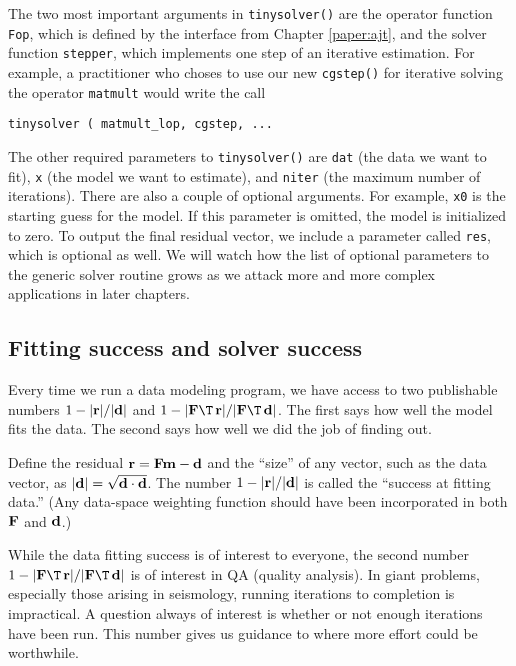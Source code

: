 \par
The two most important arguments in \texttt{tinysolver()}
are the operator function \texttt{Fop},
which is defined by the interface from Chapter \ref{paper:ajt},
and the solver function \texttt{stepper},
which implements one step of an iterative estimation.
For example, a practitioner who choses to use our new
\texttt{cgstep()} 
for iterative solving the operator
\texttt{matmult} 
would write the call
\par
\texttt{tinysolver ( matmult\_lop, cgstep, ...}
\par
The other required parameters to \texttt{tinysolver()} 
are \texttt{dat} (the data we want to fit),
\texttt{x} (the model we want to estimate),
and \texttt{niter} (the maximum number of iterations).
There are also a couple of optional arguments.
For example, \texttt{x0} is the starting guess for the model.
If this parameter is omitted, the model is initialized to zero.
To output the final residual vector,
we include a parameter called \texttt{res},
which is optional as well.
We will watch how the list of optional parameters
to the generic solver routine grows
as we attack more and more complex applications in later chapters.

\subsection{Fitting success and solver success}
Every time we run a data modeling program,
we have access to two publishable numbers
$1-|\bold r|/|\bold d|$ and
$1-|\bold F\T\,\bold r|/|\bold F\T\,\bold d|$.
The first says how well the model fits the data.
The second says how well we did the job of finding out.
\par
Define the residual $\bold r=\bold F\bold m-\bold d$ and
the ``size'' of any vector, such as the data vector,
as $|\bold d|=\sqrt{\bold d \cdot \bold d}$.
The number $1-|\bold r|/|\bold d|$ is called the
``success at fitting data.''
(Any data-space weighting function
should have been incorporated in both $\bold F$ and $\bold d$.)
\par
While the data fitting success is of interest to everyone,
the second number
$1-|\bold F\T\,\bold r|/|\bold F\T\,\bold d|$
is of interest in QA (quality analysis).
In giant problems,
especially those arising in seismology,
running iterations to completion is impractical.
A question always of interest is whether or not enough iterations have been run.
This number gives us guidance to where more effort could be worthwhile.
\par
{}



